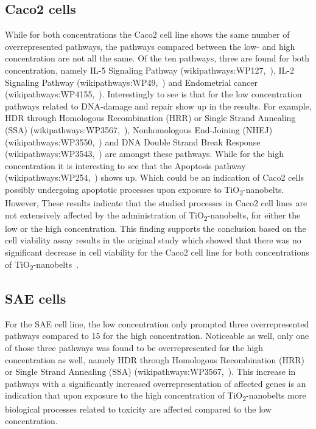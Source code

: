 \documentclass[ijms,article,submit,moreauthors,pdftex]{Definitions/mdpi}
\begin{document}
\subsection*{Caco2 cells}
While for both concentrations the Caco2 cell line shows the same number of overrepresented pathways, the pathways compared between the low- and high concentration are not all the same. Of the ten pathways, three are found for both concentration, namely IL-5 Signaling Pathway (wikipathways:WP127,~\cite{WP127}), IL-2 Signaling Pathway (wikipathways:WP49,~\cite{WP49}) and Endometrial cancer (wikipathways:WP4155,~\cite{WP4155}). Interestingly to see is that for the low concentration pathways related to DNA-damage and repair show up in the results. For example, HDR through Homologous Recombination (HRR) or Single Strand Annealing (SSA) (wikipathways:WP3567,~\cite{WP3567}), Nonhomologous End-Joining (NHEJ) (wikipathways:WP3550,~\cite{WP3550}) and DNA Double Strand Break Response (wikipathways:WP3543,~\cite{WP3543}) are amongst these pathways. While for the high concentration it is interesting to see that the Apoptosis pathway (wikipathways:WP254,~\cite{WP254}) shows up. Which could be an indication of Caco2 cells possibly undergoing apoptotic processes upon exposure to TiO\textsubscript{2}-nanobelts. However, These results indicate that the studied processes in Caco2 cell lines are not extensively affected by the administration of TiO\textsubscript{2}-nanobelts, for either the low or the high concentration. This finding supports the conclusion based on the cell viability assay results in the original study which showed that there was no significant decrease in cell viability for the Caco2 cell line for both concentrations of TiO\textsubscript{2}-nanobelts~\cite{Tilton2013}. 

\subsection*{SAE cells}
For the SAE cell line, the low concentration only prompted three overrepresented pathways compared to 15 for the high concentration. Noticeable as well, only one of those three pathways was found to be overrepresented for the high concentration as well, namely HDR through Homologous Recombination (HRR) or Single Strand Annealing (SSA) (wikipathways:WP3567,~\cite{WP3567}). This increase in pathways with a significantly increased overrepresentation of affected genes is an indication that upon exposure to the high concentration of TiO\textsubscript{2}-nanobelts more biological processes related to toxicity are affected compared to the low concentration. 
\end{document}
